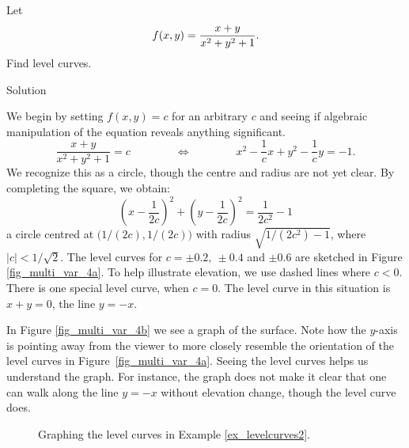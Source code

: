 \begin{example}\label{ex_levelcurves2}
Let $$\displaystyle f(x,y) = \frac{x+y}{x^2+y^2+1}.$$ 
Find level curves.

Solution 

We begin by setting $f(x,y)=c$ for an arbitrary $c$ and seeing if algebraic manipulation of the equation reveals anything significant.
\begin{equation*}
\frac{x+y}{x^2+y^2+1}  = c \qquad\qquad \Leftrightarrow \qquad\qquad x^2-\dfrac{1}{c}x+y^2-\dfrac{1}{c}y = -1.
\end{equation*}
We recognize this as a circle, though the centre and radius are not yet clear. By completing the square, we obtain:
$$
\left(x-\frac{1}{2c}\right)^2+\left(y-\frac1{2c}\right)^2=\frac{1}{2c^2}-1$$
a circle centred at $\big(1/(2c),1/(2c)\big)$ with radius $\sqrt{1/(2c^2)-1}$, where $|c|<1/\sqrt{2}$. The level curves for $c=\pm 0.2,\ \pm 0.4$ and $\pm0.6$ are sketched in Figure \ref{fig_multi_var_4a}. To help illustrate  elevation, we use dashed lines where $c<0$. There is one special level curve, when $c=0$. The level curve in this situation is $x+y=0$, the line $y=-x$.

In Figure \ref{fig_multi_var_4b} we see a graph of the surface. Note how the $y$-axis is pointing away from the viewer to more closely resemble the orientation of the level curves in Figure~\ref{fig_multi_var_4a}. Seeing the level curves helps us understand the graph. For instance, the graph does not make it clear that one can walk along the line $y=-x$ without elevation change, though the level curve does.

\begin{figure}[H]
\centering
\qquad
{}
\caption{Graphing the level curves in Example \ref{ex_levelcurves2}. }
\end{figure}
\end{example}

